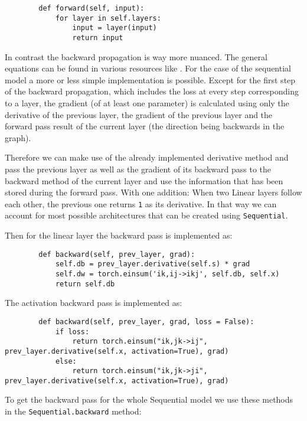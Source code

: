 \documentclass[11pt,english]{article}
\begin{document}
	\begin{lstlisting}
		def forward(self, input):
			for layer in self.layers:
				input = layer(input)
				return input
	\end{lstlisting}

	In contrast the backward propagation is way more nuanced. The general equations can be found in various resources like \cite{Fleuret2022,Goodfellow-et-al-2016}. For the case of the sequential model a more or less simple implementation is possible. Except for the first step of the backward propagation, which includes the loss at every step corresponding to a layer, the gradient (of at least one parameter) is calculated using only the derivative of the previous layer, the gradient of the previous layer and the forward pass result of the current layer (the direction being backwards in the graph). 
	
	Therefore we can make use of the already implemented derivative method and pass the previous layer as well as the gradient of its backward pass to the backward method of the current layer and use the information that has been stored during the forward pass. With one addition: When two Linear layers follow each other, the previous one returns \lstinline|1| as its derivative. In that way we can account for most possible architectures that can be created using \lstinline|Sequential|.
	
	Then for the linear layer the backward pass is implemented as:
	
	\begin{lstlisting}
		def backward(self, prev_layer, grad):
			self.db = prev_layer.derivative(self.s) * grad
			self.dw = torch.einsum('ik,ij->ikj', self.db, self.x)
			return self.db
	\end{lstlisting} 
	
	The activation backward pass is implemented as:
	
	\begin{lstlisting}
		def backward(self, prev_layer, grad, loss = False):
			if loss:
				return torch.einsum("ik,jk->ij", prev_layer.derivative(self.x, activation=True), grad) 
			else:
				return torch.einsum("ik,jk->ji", prev_layer.derivative(self.x, activation=True), grad) 
	\end{lstlisting}

	To get the backward pass for the whole Sequential model we use these methods in the \lstinline|Sequential.backward| method:
	
\end{document}

